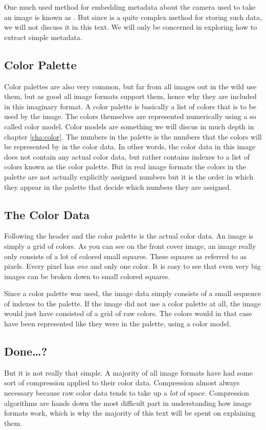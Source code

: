 One much used method for embedding metadata about the camera used to
take an image is known as
\exif\cite{camera:_cipa_dc_trans_exchan}. But since \exif is a quite
complex method for storing such data, we will not discuss it in this
text. We will only be concerned in exploring how to extract simple
metadata.

\subsection{Color Palette}

Color palettes are also very common, but far from all images out in
the wild use them, but as good all image formats support them, hence
why they are included in this imaginary format. A color palette is
basically a list of colors that is to be used by the image. The colors
themselves are represented numerically using a so called color
model. Color models are something we will discus in much depth in
chapter \ref{cha:color}. The numbers in the palette is the numbers
that the colors will be represented by in the color data. In other
words, the color data in this image does not contain any actual color
data, but rather contains indexes to a list of colors known as the
color palette. But in real image formats the colors in the palette are
not actually explicitly assigned numbers but it is the order in which
they appear in the palette that decide which numbers they are
assigned.

\subsection{The Color Data}

Following the header and the color palette is the actual color data.
An image is simply a grid of colors. As you can see on the front cover
image, an image really only consists of a lot of colored small
squares. These squares as referred to as
pixels\cite{murray1996encyclopedia}. Every pixel has \textit{one} and
only one color. It is easy to see that even very big images can be
broken down to small colored squares.

Since a color palette was used, the image data simply consists of a
small sequence of indexes to the palette. If the image did not use a
color palette at all, the image would just have consisted of a grid of
raw colors. The colors would in that case have been represented like
they were in the palette, using a color model.

\subsection{Done\dots?}

But it is not really that simple. A majority of all image formats have
had some sort of compression applied to their color data. Compression
almost always necessary because raw color data tends to take up a
\textit{lot} of space. Compression algorithms are hands down the most
difficult part in understanding how image formats work, which is why
the majority of this text will be spent on explaining them.

